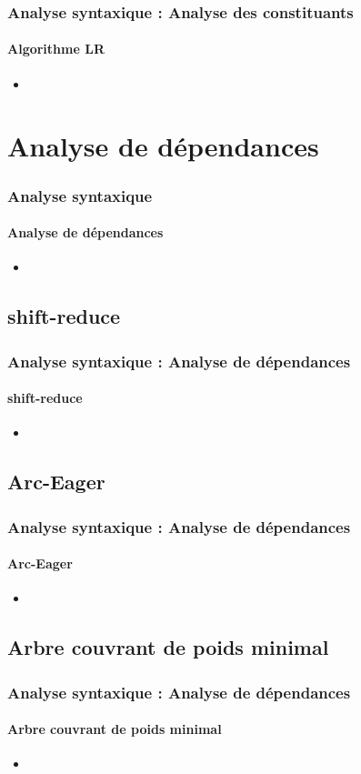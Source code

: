 \documentclass[xcolor=table]{beamer}
\begin{document}
\begin{frame}
\frametitle{Analyse syntaxique : Analyse des constituants}
\framesubtitle{Algorithme LR}

\begin{itemize}
	\item 
\end{itemize}

\end{frame}

\section{Analyse de dépendances}

\begin{frame}
\frametitle{Analyse syntaxique}
\framesubtitle{Analyse de dépendances}

\begin{itemize}
	\item 
\end{itemize}

\end{frame}

\subsection{shift-reduce}

\begin{frame}
\frametitle{Analyse syntaxique : Analyse de dépendances}
\framesubtitle{shift-reduce}

\begin{itemize}
	\item 
\end{itemize}

\end{frame}

\subsection{Arc-Eager}

\begin{frame}
\frametitle{Analyse syntaxique : Analyse de dépendances}
\framesubtitle{Arc-Eager}

\begin{itemize}
	\item 
\end{itemize}

\end{frame}

\subsection{Arbre couvrant de poids minimal}

\begin{frame}
\frametitle{Analyse syntaxique : Analyse de dépendances}
\framesubtitle{Arbre couvrant de poids minimal}

\begin{itemize}
	\item 
\end{itemize}

\end{frame}

\end{document}
